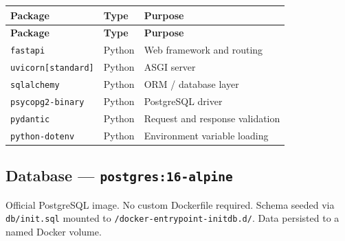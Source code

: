 \documentclass[12pt, letterpaper]{article}
\begin{document}
\begin{longtable}{p{4.5cm} p{2cm} p{7cm}}
    \toprule
    \textbf{Package} & \textbf{Type} & \textbf{Purpose} \\
    \midrule
    \endfirsthead
    \toprule
    \textbf{Package} & \textbf{Type} & \textbf{Purpose} \\
    \midrule
    \endhead
    \bottomrule
    \endfoot
    \texttt{fastapi}           & Python & Web framework and routing \\
    \texttt{uvicorn[standard]} & Python & ASGI server \\
    \texttt{sqlalchemy}        & Python & ORM / database layer \\
    \texttt{psycopg2-binary}   & Python & PostgreSQL driver \\
    \texttt{pydantic}          & Python & Request and response validation \\
    \texttt{python-dotenv}     & Python & Environment variable loading \\
\end{longtable}

\subsection{Database --- \texttt{postgres:16-alpine}}

Official PostgreSQL image. No custom Dockerfile required. Schema seeded via \texttt{db/init.sql} mounted to \texttt{/docker-entrypoint-initdb.d/}. Data persisted to a named Docker volume.
\end{document}
